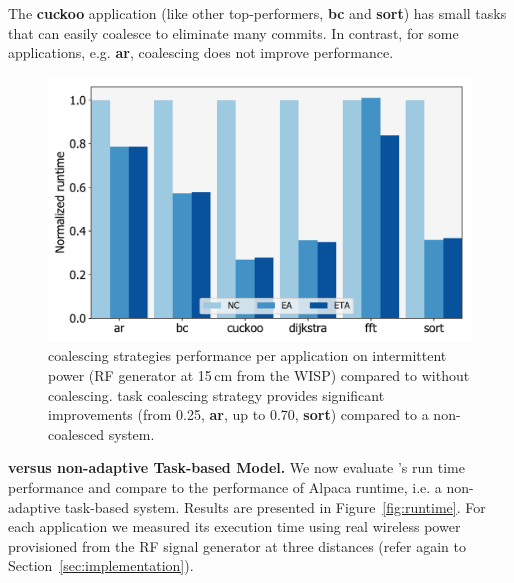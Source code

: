The \textbf{cuckoo} application (like other top-performers, \textbf{bc} and \textbf{sort}) has small tasks that \sys can easily coalesce to eliminate many commits. In contrast, for some applications, e.g. \textbf{ar}, coalescing does not improve performance. 


\begin{figure}
	\centering
	\includegraphics[width=0.5\columnwidth]{figures/coalStrategies}
	\caption{\sys coalescing strategies performance per application on intermittent power (RF generator at 15\,cm from the WISP) compared to \sys without coalescing. \sys task coalescing strategy provides significant improvements (from 0.25, \textbf{ar}, up to 0.70, \textbf{sort}) compared to a non-coalesced system. }
	\label{fig:coalescing}
\end{figure}

\textbf{\sys versus non-adaptive Task-based Model.} We now evaluate \sys's run time performance and compare \sys to the performance of Alpaca runtime, i.e. a non-adaptive task-based system. Results are presented in Figure~\ref{fig:runtime}. For each application we measured its execution time using real wireless power provisioned from the RF signal generator at three distances (refer again to Section~\ref{sec:implementation}).

